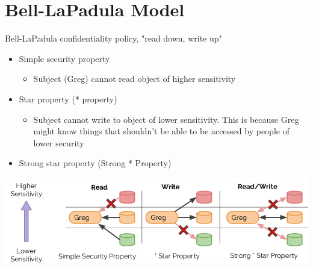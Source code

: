 \documentclass{article}[18pt]
\begin{document}
\section{Bell-LaPadula Model}
Bell-LaPadula confidentiality policy, "read down, write up"
\begin{itemize}
	\item Simple security property
	\begin{itemize}
		\item Subject (Greg) cannot read object of higher sensitivity
	\end{itemize}
	\item Star property (* property)
	\begin{itemize}
		\item Subject cannot write to object of lower sensitivity. This is because Greg might know things that shouldn't be able to be accessed by people of lower security
	\end{itemize}
	\item Strong star property (Strong * Property)
\end{itemize}
\begin{center}
	\includegraphics[scale=0.7]{Bell-LaPadula}
\end{center}
\end{document}
